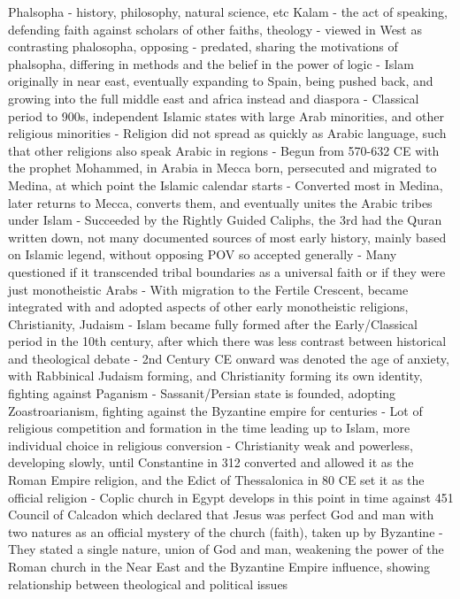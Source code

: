\documentclass[11 pt, twoside]{article}
\begin{document}
Phalsopha - history, philosophy, natural science, etc
Kalam - the act of speaking, defending faith against scholars of other faiths, theology
	  - viewed in West as contrasting phalosopha, opposing
	  - predated, sharing the motivations of phalsopha, differing in methods and the belief in the power of logic
- Islam originally in near east, eventually expanding to Spain, being pushed back, and growing into the full middle east and africa instead and diaspora
- Classical period to 900s, independent Islamic states with large Arab minorities, and other religious minorities
	- Religion did not spread as quickly as Arabic language, such that other religions also speak Arabic in regions
	- Begun from 570-632 CE with the prophet Mohammed, in Arabia in Mecca born, persecuted and migrated to Medina, at which point the Islamic calendar starts
	- Converted most in Medina, later returns to Mecca, converts them, and eventually unites the Arabic tribes under Islam
	- Succeeded by the Rightly Guided Caliphs, the 3rd had the Quran written down, not many documented sources of most early history, mainly based on Islamic legend, without opposing POV so accepted generally
	- Many questioned if it transcended tribal boundaries as a universal faith or if they were just monotheistic Arabs
	- With migration to the Fertile Crescent, became integrated with and adopted aspects of other early monotheistic religions, Christianity, Judaism
- Islam became fully formed after the Early/Classical period in the 10th century, after which there was less contrast between historical and theological debate
- 2nd Century CE onward was denoted the age of anxiety, with Rabbinical Judaism forming, and Christianity forming its own identity, fighting against Paganism
	- Sassanit/Persian state is founded, adopting Zoastroarianism, fighting against the Byzantine empire for centuries
	- Lot of religious competition and formation in the time leading up to Islam, more individual choice in religious conversion
	- Christianity weak and powerless, developing slowly, until Constantine in 312 converted and allowed it as the Roman Empire religion, and the Edict of Thessalonica in 80 CE set it as the official religion
	- Coplic church in Egypt develops in this point in time against 451 Council of Calcadon which declared that Jesus was perfect God and man with two natures as an official mystery of the church (faith), taken up by Byzantine
		- They stated a single nature, union of God and man, weakening the power of the Roman church in the Near East and the Byzantine Empire influence, showing relationship between theological and political issues
\end{document}
